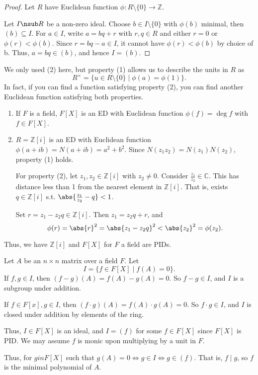 \begin{proof}
    Let \(R\) have Euclidean function \(\phi: R \setminus \{0\}\to \mathbb{Z}\).

    Let \(I \nsub R\) be a non-zero ideal. Choose \(b \in I\setminus \{0\}\) with \(\phi(b)\) minimal, then \((b) \subseteq I\). For \(a \in I\), write \(a = bq + r\) with \(r,q \in R\) and either \(r = 0\) or \(\phi(r) < \phi(b)\). Since \(r = bq - a \in I\), it cannot have \(\phi(r) < \phi(b)\) by choice of b. Thus, \(a = bq \in (b)\), and hence \(I = (b)\).
\end{proof}
\begin{remark}
    We only used (2) here, but property (1) allows us to describe the units in \(R\) as
    \[
        R^\times = \{u \in R\setminus \{0\} \mid \phi(a) = \phi(1)\}.
    \]
    In fact, if you can find a function satisfying property (2), you can find another Euclidean function satisfying both properties.
\end{remark}
\begin{example}
    \leavevmode
    \begin{enumerate}
        \item If \(F\) is a field, \(F[X]\) is an ED with Euclidean function \(\phi(f) = \deg f\) with \(f \in F[X]\).
        \item \(R = \mathbb{Z}[i]\) is an ED with Euclidean function \(\phi(a + ib) = N(a + ib) = a^2 + b^2\). Since \(N(z_{1}z_2) = N(z_1)N(z_2)\), property (1) holds.
        
        For property (2), let \(z_1, z_2 \in \mathbb{Z}[i]\) with \(z_2 \neq 0\). Consider \(\frac{z_1}{z_2}\in \mathbb{C}\). This has distance less than 1 from the nearest element in \(\mathbb{Z}[i]\). That is, exists \(q \in \mathbb{Z}[i]\) s.t. \(\abs{\frac{z_1}{z_2}-q}<1 \).

        Set \(r = z_1 - z_{2}q \in \mathbb{Z}[i]\). Then \(z_1 = z_2 q + r\), and
        \[
            \phi(r) = \abs{r}^2 = \abs{z_1 - z_2 q}^2 < \abs{z_2}^2 = \phi(z_2).
        \]
    \end{enumerate}
    Thus, we have \(\mathbb{Z}[i]\) and \(F[X]\) for \(F\) a field are PIDs.
\end{example}
\begin{example}
    Let \(A\) be an \(n \times n\) matrix over a field \(F\). Let
    \[I = \{f \in F[X]\mid f(A) = 0\}.\]
    If \(f, g\in I\), then \((f-g)(A) = f(A) - g(A) = 0\). So \(f-g \in I\), and \(I\) is a subgroup under addition.

    If \(f\in F[x], g\in I\), then \((f\cdot g)(A) = f(A) \cdot g(A) = 0\). So \(f\cdot g \in I\), and \(I\) is closed under addition by elements of the ring.

    Thus, \(I \in F[X]\) is an ideal, and \(I = (f)\) for some \(f \in F[X]\) since \(F[X]\) is PID. We may assume \(f\) is monic upon multiplying by a unit in \(F\).

    Thus, for \(g in F[X]\) such that \(g(A) = 0 \iff g \in I \iff g \in (f)\). That is, \(f \mid g\), so \(f\) is the minimal polynomial of \(A\).
\end{example}
